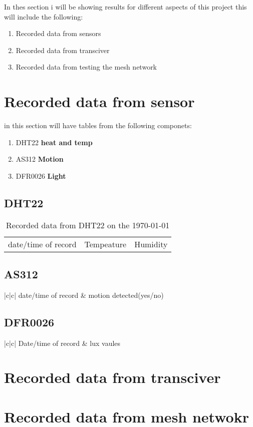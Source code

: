 In thes section i will  be showing results for  different aspects of this project this  will  include the following:
\begin{enumerate}
    \item Recorded data from sensors
    \item Recorded data from transciver
    \item Recorded data from  testing the mesh network
\end{enumerate}
\section{Recorded data from sensor}
in this section  will have  tables from the following componets:
\begin{enumerate}
    \item DHT22 \textbf{heat and temp}
    \item AS312 \textbf{Motion }
    \item DFR0026 \textbf{Light}
\end{enumerate}
\subsection{DHT22}
\begin{table}
    \begin{tabular}{|c|c|c|}
        \hline
        date/time of record & Tempeature &Humidity 
        \hline\hline
    \end{tabular}
    \caption{Recorded data from  DHT22 on the \today}
    \label*{Recorded data from  DHT22 on the \today}
\end{table}
\subsection*{AS312}
\begin{table}
    \begin{tabular*}{|c|c|}
        date/time of record & motion detected(yes/no)
    \end{tabular*}
    \caption*{Recorded data from  AS312 on the \today}
    \label*{Recorded data from  AS312 on the \today}
\end{table}
\subsection{DFR0026}
\begin{table}
    \begin{tabular*}{|c|c|}
        Date/time of record & lux vaules
    \end{tabular*}
    \caption*{Recorded data from DFR0026 on the \today}
    \label*{Recorded data from DFR0026 on the \today}
\end{table}
\section{Recorded data from transciver}
\section{Recorded data from mesh netwokr}
